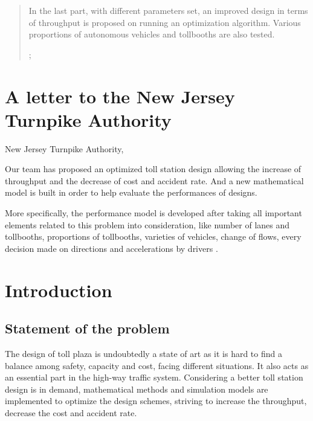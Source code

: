 \documentclass{mcmthesis}
\begin{document}
\begin{abstract}
In the last part, with different parameters set, an improved design in terms of throughput is proposed on running an optimization algorithm. Various proportions of autonomous vehicles and tollbooths are also tested.

\begin{keywords}
;
\end{keywords}
\end{abstract}

\maketitle
\tableofcontents
\clearpage








\section{A letter to the New Jersey Turnpike Authority}


New Jersey Turnpike Authority,

Our team has proposed an optimized toll station design allowing the increase of throughput and the decrease of cost and accident rate. And a new mathematical model is built in order to help evaluate the performances of designs. 

More specifically, the performance model is developed after taking all important elements related to this problem into consideration, like number of lanes and tollbooths, proportions of tollbooths, varieties of vehicles, change of flows, every decision made on directions and accelerations by drivers . 



\section{Introduction}

\subsection{Statement of the problem}

The design of toll plaza is undoubtedly a state of art as it is hard to find a balance among safety, capacity and cost, facing different situations. It also acts as an essential part in the high-way traffic system. Considering a better toll station design is in demand, mathematical methods and simulation models are implemented to optimize the design schemes, striving to increase the throughput, decrease the cost and accident rate.
\end{document}

